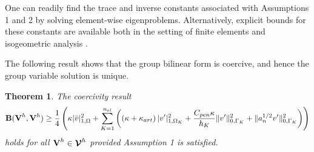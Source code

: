 \documentclass[11pt]{article}
\newtheorem{theorem}{Theorem}[section]
\begin{document}
\noindent One can readily find the trace and inverse constants associated with Assumptions 1 and 2 by solving element-wise eigenproblems.  Alternatively, explicit bounds for these constants are available both in the setting of finite elements and isogeometric analysis \cite{Bazilevs06,Evans13,Harari92,Warburton03}.

The following result shows that the group bilinear form is coercive, and hence the group variable solution is unique.

\begin{theorem} \label{theorem1}
The coercivity result
\begin{equation}
\textup{\textbf{B}}(\textup{\textbf{V}}^h,\textup{\textbf{V}}^h) \geq \frac{1}{4} \left( \kappa | \bar{v} |^2_{1,\Omega} + \sum_{K=1}^{n_{el}} \left( \left( \kappa + \kappa_{art} \right) | v' |^2_{1,\Omega_K} + \frac{C_{pen}\kappa}{h_K} \| v' \|^2_{0,\Gamma_K} + \| a_n^{1/2} v' \|^2_{0,\Gamma_K} \right) \right) \nonumber
\end{equation}
holds for all $\textup{\textbf{V}}^h \in \bm{\mathcal{V}}^h$ provided Assumption 1 is satisfied.
\end{theorem}
\end{document}
